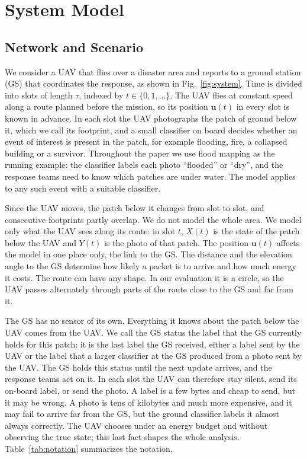 \documentclass[5p,twocolumn]{elsarticle}
\theoremstyle{remark}
\begin{document}
\section{System Model}\label{sec:model}
\subsection{Network and Scenario}\label{sec:story}
We consider a UAV that flies over a disaster area and reports to a ground station (GS) that coordinates the response, as shown in Fig.~\ref{fig:system}. Time is divided into slots of length $\tau$, indexed by $t\in\{0,1,\dots\}$. The UAV flies at constant speed along a route planned before the mission, so its position $\mathbf{u}(t)$ in every slot is known in advance. In each slot the UAV photographs the patch of ground below it, which we call its footprint, and a small classifier on board decides whether an event of interest is present in the patch, for example flooding, fire, a collapsed building or a survivor. Throughout the paper we use flood mapping as the running example: the classifier labels each photo ``flooded'' or ``dry'', and the response teams need to know which patches are under water. The model applies to any such event with a suitable classifier.

Since the UAV moves, the patch below it changes from slot to slot, and consecutive footprints partly overlap. We do not model the whole area. We model only what the UAV sees along its route: in slot $t$, $X(t)$ is the state of the patch below the UAV and $Y(t)$ is the photo of that patch. The position $\mathbf{u}(t)$ affects the model in one place only, the link to the GS. The distance and the elevation angle to the GS determine how likely a packet is to arrive and how much energy it costs. The route can have any shape. In our evaluation it is a circle, so the UAV passes alternately through parts of the route close to the GS and far from it.

The GS has no sensor of its own. Everything it knows about the patch below the UAV comes from the UAV. We call the GS status the label that the GS currently holds for this patch: it is the last label the GS received, either a label sent by the UAV or the label that a larger classifier at the GS produced from a photo sent by the UAV. The GS holds this status until the next update arrives, and the response teams act on it. In each slot the UAV can therefore stay silent, send its on-board label, or send the photo. A label is a few bytes and cheap to send, but it may be wrong. A photo is tens of kilobytes and much more expensive, and it may fail to arrive far from the GS, but the ground classifier labels it almost always correctly. The UAV chooses under an energy budget and without observing the true state; this last fact shapes the whole analysis. Table~\ref{tab:notation} summarizes the notation.
\end{document}
